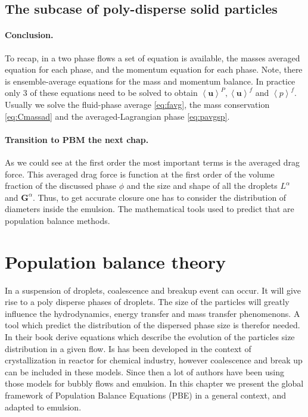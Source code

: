 \subsection{The subcase of poly-disperse solid particles}

\paragraph*{Conclusion.} To recap, in a two phase flows a set of equation is available, the masses averaged equation for each phase, and the momentum  equation for each phase. 
Note, there is ensemble-average equations for the mass and momentum balance. 
In practice only 3 of these equations need to be solved to obtain $\left<\bm{u}\right>^P,\left<\bm{u}\right>^f$ and $\left<p\right>^f$. 
Usually we solve the fluid-phase average \ref{eq:favg}, the mass conservation \ref{eq:Cmassad} and the averaged-Lagrangian phase \ref{eq:pavgsp}.

\paragraph*{Transition to PBM the next chap.} 
As we could see at the first order the most important terms is the averaged drag force. 
This averaged drag force is function at the first order of the volume fraction of the discussed phase $\phi$ and the size and shape of all the droplets $L^\alpha$ and $\bm{G}^\alpha$.
Thus, to get accurate closure one has to consider the distribution of diameters inside the emulsion. 
The mathematical tools used to predict that are population balance methods. 

\section{Population balance theory}
\label{chap:PBE}
In a suspension of droplets, coalescence and breakup event can occur.
It will give rise to a poly disperse phases of droplets. 
The size of the particles will greatly influence the hydrodynamics, energy transfer and mass transfer phenomenons.
A tool which predict the distribution of the dispersed phase size is therefor needed.
In their book \citet{randolph2012theory} derive equations which describe the evolution of the particles size distribution in a given flow.    
Is has been developed in the context of crystallization in reactor for chemical industry, however coalescence and break up can be included in these models.
Since then a lot of authors \citep{marchisio2013computational} have been using those models for bubbly flows and emulsion. 
In this chapter we present the global framework of Population Balance Equations (PBE) in a general context, and adapted to emulsion. 

